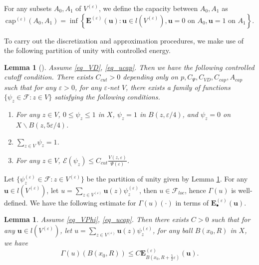 \documentclass[11pt,a4paper]{article}
\numberwithin{equation}{section}
\theoremstyle{plain}
\newtheorem{lemma}[theorem]{Lemma}
\theoremstyle{definition}
\begin{document}
For any subsets $A_0,A_1$ of $V^{(\varepsilon)}$, we define the capacity between $A_0,A_1$ as
$$\mathrm{cap}^{(\varepsilon)}(A_0,A_1)=\inf \left\{\mathbf{E}^{(\varepsilon)}(\mathbf{u}):\mathbf{u}\in l(V^{(\varepsilon)}),\mathbf{u}=0\text{ on }A_0,\mathbf{u}=1\text{ on }A_1\right\}.$$

To carry out the discretization and approximation procedures, we make use of the following partition of unity with controlled energy.

\begin{lemma}[{\cite[Lemma 3.2]{Yan25a}}]\label{lem_partition}
Assume \ref{eq_VD}, \ref{eq_ucap}. Then we have the following controlled cutoff condition. There exists $C_{cut}>0$ depending only on $p, C_{\Psi}, C_{VD}, C_{cap}, A_{cap}$ such that for any $\varepsilon>0$, for any $\varepsilon$-net $V$, there exists a family of functions $\{\psi_z\in\mathcal{F}:z\in V\}$ satisfying the following conditions.
\begin{enumerate}[label=(CO\arabic*)]
\item\label{item_COspt} For any $z\in V$, $0\le\psi_z\le 1$ in $X$, $\psi_z=1$ in $B(z,\varepsilon/4)$, and $\psi_z=0$ on $X\backslash B(z,5\varepsilon/4)$.
\item\label{item_COunit} $\sum_{z\in V}\psi_z=1$.
\item\label{item_COenergy} For any $z\in V$, $\mathcal{E}(\psi_z)\le C_{cut}\frac{V(z,\varepsilon)}{\Psi(\varepsilon)}$.
\end{enumerate}
\end{lemma}

Let $\{\psi_z^{(\varepsilon)}\in\mathcal{F}:z\in V^{(\varepsilon)}\}$ be the partition of unity given by Lemma \ref{lem_partition}. For any $\mathbf{u}\in l(V^{(\varepsilon)})$, let $u=\sum_{z\in V^{(\varepsilon)}}\mathbf{u}(z)\psi_z^{(\varepsilon)}$, then $u\in\mathcal{F}_{loc}$, hence $\Gamma(u)$ is well-defined. We have the following estimate for $\Gamma(u)(\cdot)$ in terms of $\mathbf{E}^{(\varepsilon)}_{\bullet}(\mathbf{u})$.

\begin{lemma}\label{lem_Gammabfu}
Assume \ref{eq_VPhi}, \ref{eq_ucap}. Then there exists $C>0$ such that for any $\mathbf{u}\in l(V^{(\varepsilon)})$, let $u=\sum_{z\in V^{(\varepsilon)}}\mathbf{u}(z)\psi_z^{(\varepsilon)}$, for any ball $B(x_0,R)$ in $X$, we have
$$\Gamma(u)(B(x_0,R))\le C\mathbf{E}^{(\varepsilon)}_{B(x_0,R+\frac{5}{2}\varepsilon)}(\mathbf{u}).$$
\end{lemma}
\end{document}
